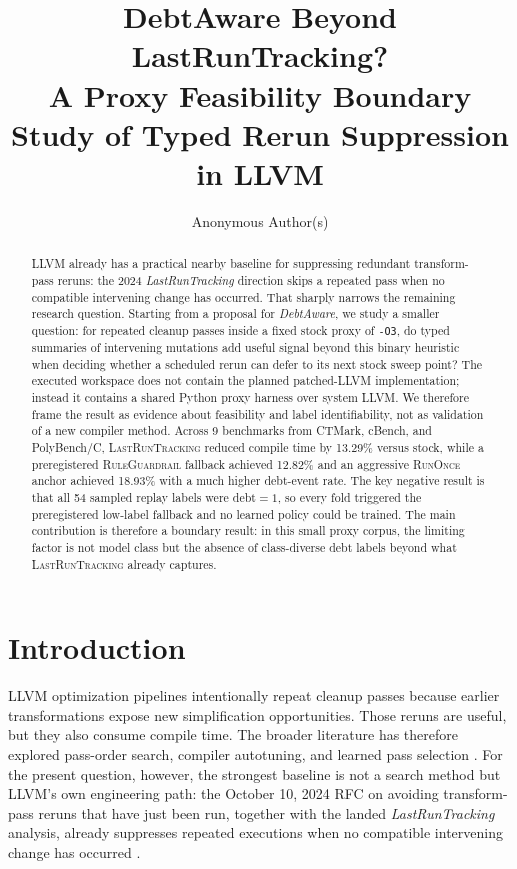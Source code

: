 \documentclass{article}
\title{DebtAware Beyond LastRunTracking?\\A Proxy Feasibility Boundary Study of Typed Rerun Suppression in LLVM}
\author{Anonymous Author(s)}
\begin{document}
\maketitle

\begin{abstract}
LLVM already has a practical nearby baseline for suppressing redundant transform-pass reruns: the 2024 \emph{LastRunTracking} direction skips a repeated pass when no compatible intervening change has occurred. That sharply narrows the remaining research question. Starting from a proposal for \emph{DebtAware}, we study a smaller question: for repeated cleanup passes inside a fixed stock proxy of \texttt{-O3}, do typed summaries of intervening mutations add useful signal beyond this binary heuristic when deciding whether a scheduled rerun can defer to its next stock sweep point? The executed workspace does not contain the planned patched-LLVM implementation; instead it contains a shared Python proxy harness over system LLVM. We therefore frame the result as evidence about feasibility and label identifiability, not as validation of a new compiler method. Across 9 benchmarks from CTMark, cBench, and PolyBench/C, \textsc{LastRunTracking} reduced compile time by 13.29\% versus stock, while a preregistered \textsc{RuleGuardrail} fallback achieved 12.82\% and an aggressive \textsc{RunOnce} anchor achieved 18.93\% with a much higher debt-event rate. The key negative result is that all 54 sampled replay labels were debt$=1$, so every fold triggered the preregistered low-label fallback and no learned policy could be trained. The main contribution is therefore a boundary result: in this small proxy corpus, the limiting factor is not model class but the absence of class-diverse debt labels beyond what \textsc{LastRunTracking} already captures.
\end{abstract}

\section{Introduction}

LLVM optimization pipelines intentionally repeat cleanup passes because earlier transformations expose new simplification opportunities. Those reruns are useful, but they also consume compile time. The broader literature has therefore explored pass-order search, compiler autotuning, and learned pass selection \citep{ashouri2018survey, hellsten2023baco, liang2023learning, liu2024dco, zhao2025citroen}. For the present question, however, the strongest baseline is not a search method but LLVM's own engineering path: the October 10, 2024 RFC on avoiding transform-pass reruns that have just been run, together with the landed \emph{LastRunTracking} analysis, already suppresses repeated executions when no compatible intervening change has occurred \citep{llvm_rfc_avoid_running_2024, llvm_lastruntrackinganalysis_2024}.
\end{document}
